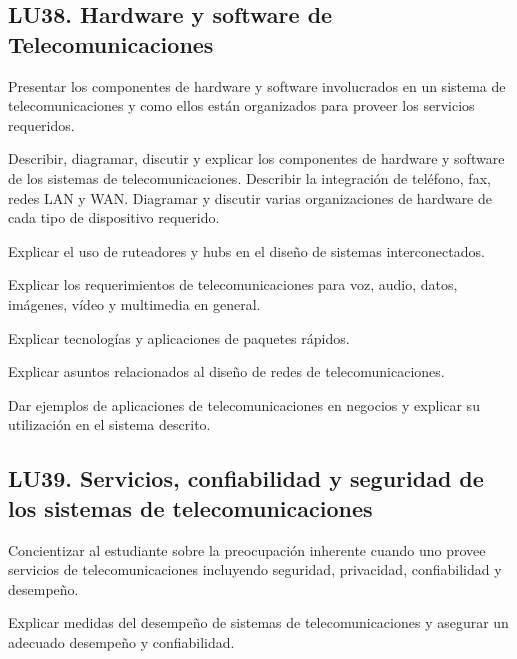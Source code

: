 \subsection{LU38. Hardware y software de Telecomunicaciones}\label{sec:LU38}
\begin{LearningUnit}
\begin{LUGoal}
\item Presentar los componentes de hardware y software involucrados en un sistema de telecomunicaciones y como ellos están organizados para proveer los servicios requeridos.
\end{LUGoal}

\begin{LUObjective}
\item Describir, diagramar, discutir y explicar los componentes de hardware y software de los sistemas de telecomunicaciones. Describir la integración de teléfono, fax, redes LAN y WAN. Diagramar y discutir  varias organizaciones de hardware de cada tipo de dispositivo requerido.
\item Explicar el uso de ruteadores y hubs en el diseño de sistemas interconectados.
\item Explicar los requerimientos de telecomunicaciones para voz, audio, datos, imágenes, vídeo y multimedia en general.
\item Explicar tecnologías y aplicaciones de paquetes rápidos.
\item Explicar asuntos relacionados al diseño de redes de telecomunicaciones.
\item Dar ejemplos de aplicaciones de telecomunicaciones en negocios y explicar su utilización en el sistema descrito.
\end{LUObjective}
\end{LearningUnit}

\subsection{LU39. Servicios, confiabilidad y seguridad de los sistemas de telecomunicaciones}\label{sec:LU39}
\begin{LearningUnit}
\begin{LUGoal}
\item Concientizar al estudiante sobre la preocupación inherente cuando uno provee servicios de telecomunicaciones incluyendo seguridad, privacidad, confiabilidad y desempeño.
\end{LUGoal}

\begin{LUObjective}
\item Explicar medidas del desempeño de sistemas de telecomunicaciones y asegurar un adecuado desempeño y confiabilidad.
\end{LUObjective}
\end{LearningUnit}

